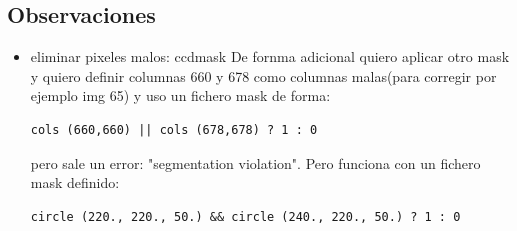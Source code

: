 \documentclass{article}
\begin{document}
\subsection*{Observaciones}
\begin{itemize}
\item eliminar pixeles malos: ccdmask
De fornma adicional quiero aplicar otro mask y quiero definir columnas 660 y 678 como columnas malas(para corregir por ejemplo img 65) y uso un fichero mask de forma:
\begin{verbatim}
cols (660,660) || cols (678,678) ? 1 : 0
\end{verbatim}
pero sale un error: "segmentation violation". Pero funciona con un fichero mask definido:
\begin{verbatim}
circle (220., 220., 50.) && circle (240., 220., 50.) ? 1 : 0
\end{verbatim}





\end{itemize}
\end{document}
